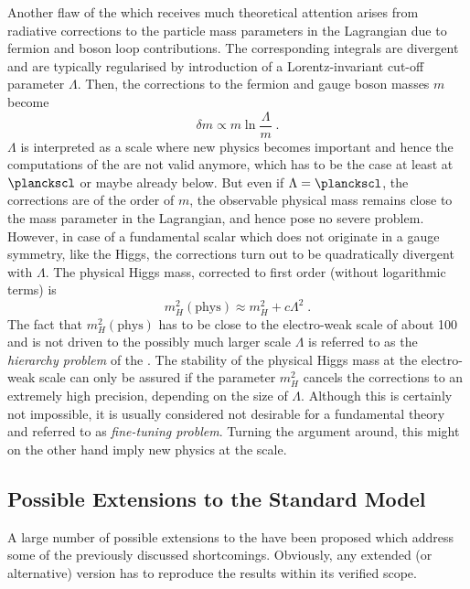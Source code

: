 Another flaw of the \sm which receives much theoretical attention arises from radiative corrections to the particle mass parameters in the Lagrangian due to fermion and boson loop contributions.
The corresponding integrals are divergent and are typically regularised by introduction of a Lorentz-invariant cut-off parameter $\Lambda$.
Then, the corrections to the fermion and gauge boson masses $m$ become
\begin{equation*}
  \delta m \propto m\ln\frac{\Lambda}{m} \;.
\end{equation*}
$\Lambda$ is interpreted as a scale where new physics becomes important and hence the computations of the \sm are not valid anymore, which has to be the case at least at $\planckscl$ or maybe already below.
But even if \mbox{$\Lambda = \planckscl$}, the corrections are of the order of $m$, \ie the observable physical mass remains close to the mass parameter in the Lagrangian, and hence pose no severe problem.
However, in case of a fundamental scalar which does not originate in a gauge symmetry, like the Higgs, the corrections turn out to be quadratically divergent with $\Lambda$.
The physical Higgs mass, corrected to first order (without logarithmic terms) is
\begin{equation*}
  m^{2}_{H}(\text{phys}) \approx m^{2}_{H} + c\Lambda^{2} \;. 
\end{equation*}
The fact that $m^{2}_{H}(\text{phys})$ has to be close to the electro-weak scale of about 100\gev~\cite{bib:Hambye:1996wb} and is not driven to the possibly much larger scale $\Lambda$ is referred to as the \emph{hierarchy problem} of the \sm.
The stability of the physical Higgs mass at the electro-weak scale can only be assured if the parameter $m^{2}_{H}$ cancels the corrections to an extremely high precision, depending on the size of $\Lambda$.
Although this is certainly not impossible, it is usually considered not desirable for a fundamental theory and referred to as \emph{fine-tuning problem}.
Turning the argument around, this might on the other hand imply new physics at the \tevnospace scale.


\subsection{Possible Extensions to the Standard Model} \label{sec:Theory:SMExtensions}
A large number of possible extensions to the \sm have been proposed which address some of the previously discussed shortcomings.
Obviously, any extended (or alternative) version has to reproduce the \sm results within its verified scope.

